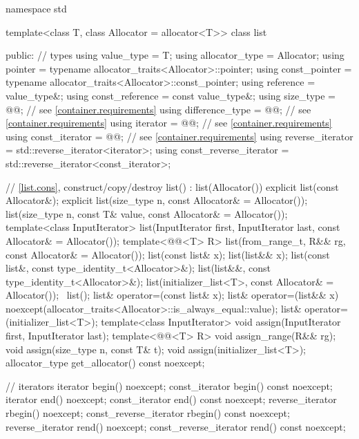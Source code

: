 \begin{codeblock}
namespace std {
  template<class T, class Allocator = allocator<T>>
  class list {
  public:
    // types
    using value_type             = T;
    using allocator_type         = Allocator;
    using pointer                = typename allocator_traits<Allocator>::pointer;
    using const_pointer          = typename allocator_traits<Allocator>::const_pointer;
    using reference              = value_type&;
    using const_reference        = const value_type&;
    using size_type              = @@; // see \ref{container.requirements}
    using difference_type        = @@; // see \ref{container.requirements}
    using iterator               = @@; // see \ref{container.requirements}
    using const_iterator         = @@; // see \ref{container.requirements}
    using reverse_iterator       = std::reverse_iterator<iterator>;
    using const_reverse_iterator = std::reverse_iterator<const_iterator>;

    // \ref{list.cons}, construct/copy/destroy
    list() : list(Allocator()) { }
    explicit list(const Allocator&);
    explicit list(size_type n, const Allocator& = Allocator());
    list(size_type n, const T& value, const Allocator& = Allocator());
    template<class InputIterator>
      list(InputIterator first, InputIterator last, const Allocator& = Allocator());
    template<@@<T> R>
      list(from_range_t, R&& rg, const Allocator& = Allocator());
    list(const list& x);
    list(list&& x);
    list(const list&, const type_identity_t<Allocator>&);
    list(list&&, const type_identity_t<Allocator>&);
    list(initializer_list<T>, const Allocator& = Allocator());
    ~list();
    list& operator=(const list& x);
    list& operator=(list&& x)
      noexcept(allocator_traits<Allocator>::is_always_equal::value);
    list& operator=(initializer_list<T>);
    template<class InputIterator>
      void assign(InputIterator first, InputIterator last);
    template<@@<T> R>
      void assign_range(R&& rg);
    void assign(size_type n, const T& t);
    void assign(initializer_list<T>);
    allocator_type get_allocator() const noexcept;

    // iterators
    iterator               begin() noexcept;
    const_iterator         begin() const noexcept;
    iterator               end() noexcept;
    const_iterator         end() const noexcept;
    reverse_iterator       rbegin() noexcept;
    const_reverse_iterator rbegin() const noexcept;
    reverse_iterator       rend() noexcept;
    const_reverse_iterator rend() const noexcept;

}}
\end{codeblock}
